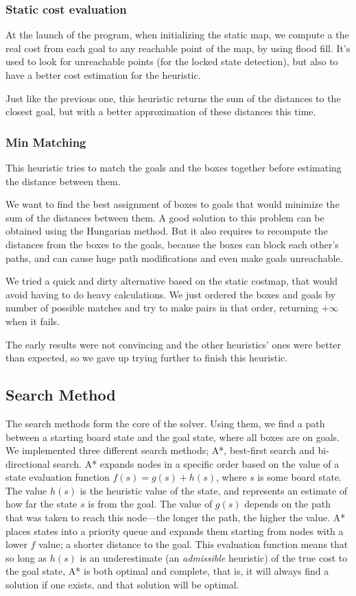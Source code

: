 \documentclass[a4paper,11pt]{article}
\begin{document}
\subsubsection{Static cost evaluation}

At the launch of the program, when initializing the static map, we compute
a the real cost from each goal to any reachable point of the map, by using
flood fill. It's used to look for unreachable points (for the locked state
detection), but also to have a better cost estimation for the heuristic.

Just like the previous one, this heuristic returns the sum of the distances
to the closest goal, but with a better approximation of these distances this
time.


\subsubsection{Min Matching}

This heuristic tries to match the goals and the boxes together before
estimating the distance between them. 

We want to find the best assignment of boxes to goals that would minimize the
sum of the distances between them. A good solution to this problem can be 
obtained using the Hungarian method. But it also requires to recompute the
distances from the boxes to the goals, because the boxes can block each other's
paths, and can cause huge path modifications and even make goals unreachable.

We tried a quick and dirty alternative based on the static costmap, that would
avoid having to do heavy calculations. We just ordered the boxes and goals by 
number of possible matches and try to make pairs in that order, returning 
$+\infty$ when it fails.

The early results were not convincing and the other heuristics' ones were better
than expected, so we gave up trying further to finish this heuristic.


\subsection{Search Method}
The search methods form the core of the solver. Using them, we find a path
between a starting board state and the goal state, where all boxes are on
goals. We implemented three different search methods; A*, best-first search and
bi-directional search. A* expands nodes in a specific order based on the value
of a state evaluation function $f(s)=g(s)+h(s)$, where $s$ is some board
state. The value $h(s)$ is the heuristic value of the state, and represents an
estimate of how far the state $s$ is from the goal. The value of $g(s)$ depends
on the path that was taken to reach this node---the longer the path, the higher
the value. A* places states into a priority queue and expands them starting from
nodes with a lower $f$ value; a shorter distance to the goal. This evaluation
function means that so long as $h(s)$ is an underestimate (an \emph{admissible}
heuristic) of the true cost to the goal state, A* is both optimal and complete,
that is, it will always find a solution if one exists, and that solution will be
optimal\cite{aima}.
\end{document}
